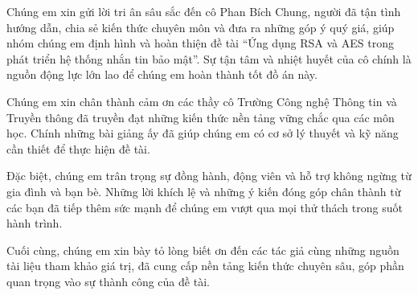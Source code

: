\indent Chúng em xin gửi lời tri ân sâu sắc đến cô Phan Bích Chung, người đã tận tình hướng dẫn, chia sẻ kiến thức chuyên môn và đưa ra những góp ý quý giá, giúp nhóm chúng em định hình và hoàn thiện đề tài “Ứng dụng RSA và AES trong phát triển hệ thống nhắn tin bảo mật”. Sự tận tâm và nhiệt huyết của cô chính là nguồn động lực lớn lao để chúng em hoàn thành tốt đồ án này.

\indent Chúng em xin chân thành cảm ơn các thầy cô Trường Công nghệ Thông tin và Truyền thông đã truyền đạt những kiến thức nền tảng vững chắc qua các môn học. Chính những bài giảng ấy đã giúp chúng em có cơ sở lý thuyết và kỹ năng cần thiết để thực hiện đề tài.

\indent Đặc biệt, chúng em trân trọng sự đồng hành, động viên và hỗ trợ không ngừng từ gia đình và bạn bè. Những lời khích lệ và những ý kiến đóng góp chân thành từ các bạn đã tiếp thêm sức mạnh để chúng em vượt qua mọi thử thách trong suốt hành trình.

\indent Cuối cùng, chúng em xin bày tỏ lòng biết ơn đến các tác giả cùng những nguồn tài liệu tham khảo giá trị, đã cung cấp nền tảng kiến thức chuyên sâu, góp phần quan trọng vào sự thành công của đề tài.

